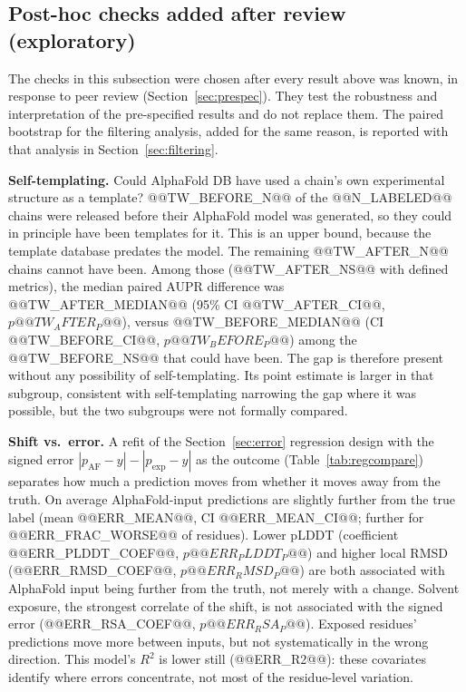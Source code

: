 \documentclass[10pt]{article}
\begin{document}
\subsection{Post-hoc checks added after review (exploratory)}
\label{sec:review}

The checks in this subsection were chosen after every result above was known,
in response to peer review (Section~\ref{sec:prespec}). They test the
robustness and interpretation of the pre-specified results and do not
replace them. The paired bootstrap for the filtering analysis, added for the
same reason, is reported with that analysis in Section~\ref{sec:filtering}.

\textbf{Self-templating.} Could AlphaFold DB have used a chain's own
experimental structure as a template? @@TW_BEFORE_N@@ of the @@N_LABELED@@
chains were released before their AlphaFold model was generated, so they
could in principle have been templates for it. This is an upper bound,
because the template database predates the model. The remaining
@@TW_AFTER_N@@ chains cannot have been. Among those (@@TW_AFTER_NS@@ with
defined metrics), the median paired AUPR difference was @@TW_AFTER_MEDIAN@@
(95\% CI @@TW_AFTER_CI@@, $p @@TW_AFTER_P@@$), versus @@TW_BEFORE_MEDIAN@@
(CI @@TW_BEFORE_CI@@, $p @@TW_BEFORE_P@@$) among the @@TW_BEFORE_NS@@ that could have been. The
gap is therefore present without any possibility of self-templating. Its
point estimate is larger in that subgroup, consistent with self-templating
narrowing the gap where it was possible, but the two subgroups were not
formally compared.

\textbf{Shift vs.\ error.} A refit of the Section~\ref{sec:error}
regression design with the signed error
$|p_{\mathrm{AF}} - y| - |p_{\mathrm{exp}} - y|$ as the outcome
(Table~\ref{tab:regcompare}) separates how much a prediction moves from
whether it moves away from the truth. On average AlphaFold-input
predictions are slightly further from the true label (mean
@@ERR_MEAN@@, CI @@ERR_MEAN_CI@@; further for @@ERR_FRAC_WORSE@@ of
residues). Lower pLDDT (coefficient @@ERR_PLDDT_COEF@@, $p @@ERR_PLDDT_P@@$)
and higher local RMSD (@@ERR_RMSD_COEF@@, $p @@ERR_RMSD_P@@$) are both
associated with AlphaFold input being further from the truth, not merely
with a change. Solvent exposure, the strongest correlate of the shift, is not
associated with the signed error (@@ERR_RSA_COEF@@, $p @@ERR_RSA_P@@$).
Exposed residues' predictions move more between inputs, but not
systematically in the wrong direction. This model's $R^2$ is lower still
(@@ERR_R2@@): these covariates identify where errors concentrate, not most of
the residue-level variation.
\end{document}
